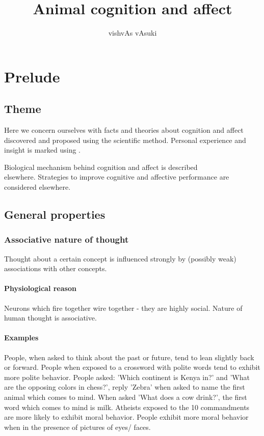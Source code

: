 \documentclass[oneside, article]{memoir}
\title{Animal cognition and affect}
\author{vishvAs vAsuki}
\begin{document}
\maketitle
\tableofcontents

\part{Prelude}
\chapter{Theme}
Here we concern ourselves with facts and theories about cognition and affect discovered and proposed using the scientific method. Personal experience and insight is marked using \experience{}.

Biological mechanism behind cognition and affect is described \\elsewhere. Strategies to improve cognitive and affective performance are considered elsewhere.

\chapter{General properties}
\section{Associative nature of thought}
Thought about a certain concept is influenced strongly by (possibly weak) associations with other concepts.

\subsection{Physiological reason}
Neurons which fire together wire together - they are highly social. Nature of human thought is associative.

\subsection{Examples}
People, when asked to think about the past or future, tend to lean slightly back or forward. People when exposed to a crossword with polite words tend to exhibit more polite behavior. People asked: 'Which continent is Kenya in?' and 'What are the opposing colors in chess?', reply 'Zebra' when asked to name the first animal which comes to mind. When asked 'What does a cow drink?', the first word which comes to mind  is milk. Atheists exposed to the 10 commandments are more likely to exhibit moral behavior. People exhibit more moral behavior when in the presence of pictures of eyes/ faces.
\end{document}
